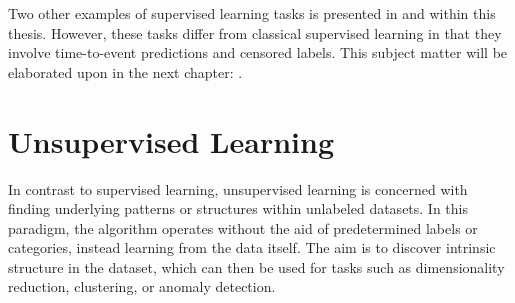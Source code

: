 Two other examples of supervised learning tasks is presented in 
 and 
within this thesis.
However, these tasks differ from classical supervised learning
in that they involve time-to-event predictions and censored labels.
This subject matter will be elaborated upon in the next chapter:
.

\section{Unsupervised Learning}

In contrast to supervised learning,
unsupervised learning is concerned with finding 
underlying patterns or structures within unlabeled datasets. 
In this paradigm, the algorithm operates without the aid of 
predetermined labels or categories, instead learning from the data itself. 
The aim is to discover intrinsic structure in the dataset, 
which can then be used for tasks such as 
dimensionality reduction, clustering, or anomaly detection.

